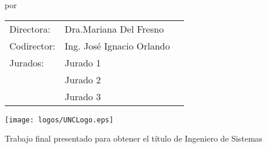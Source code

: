 \begin{titlepage}

\begin{center}

\vspace*{2\bigskipamount}

{\makeatletter
\titlestyle\color{tudelft-dark-blue}\LARGE\@title
\makeatother}

{\makeatletter
\ifx\@subtitle\undefined\else
    \bigskip
    \titlefont\titleshape\LARGE\@subtitle
\fi
\makeatother}

\bigskip
\bigskip

por

\bigskip
\bigskip

{\makeatletter
\titlefont\Large\bfseries\@author
\makeatother}
\vfill
\begin{tabular}{lll}
    Directora: & Dra.Mariana Del Fresno \\
    Codirector: & Ing. José Ignacio Orlando \\
    Jurados:
        & Jurado 1 \\
        & Jurado 2 \\
        & Jurado 3
\end{tabular}


\bigskip
\bigskip
\bigskip
\bigskip

\texttt{[image: logos/UNCLogo.eps]}
\bigskip
\bigskip


\vfill

Trabajo final presentado para obtener el título de Ingeniero de Sistemas

\bigskip
\bigskip

\bigskip
\bigskip

\bigskip
\bigskip

\end{center}

\end{titlepage}

